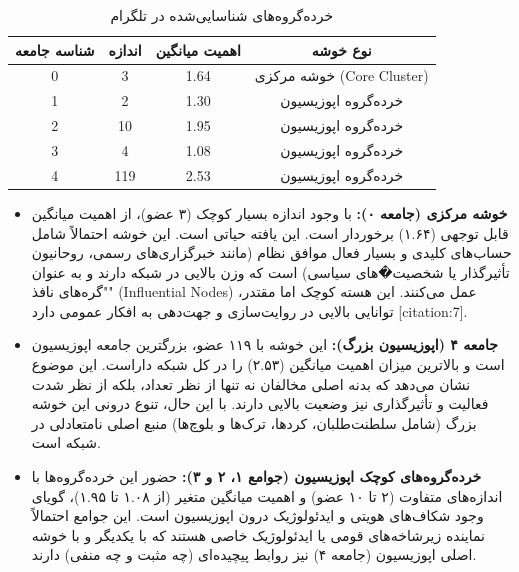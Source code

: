 \documentclass{article}
\begin{document}
	\begin{table}[h!]
		\centering
		\caption{خرده‌گروه‌های شناسایی‌شده در تلگرام}
		\label{tab:communities_telegram_2}
		\begin{tabular}{@{}cccc@{}}
			\toprule
			\textbf{شناسه جامعه} & \textbf{اندازه} & \textbf{اهمیت میانگین} & \textbf{نوع خوشه} \\ \midrule
			0                    & 3                & 1.64                   & خوشه مرکزی (Core Cluster) \\
			1                    & 2                & 1.30                   & خرده‌گروه اپوزیسیون \\
			2                    & 10               & 1.95                   & خرده‌گروه اپوزیسیون \\
			3                    & 4                & 1.08                   & خرده‌گروه اپوزیسیون \\
			4                    & 119              & 2.53                   & خرده‌گروه اپوزیسیون \\ \bottomrule
		\end{tabular}
	\end{table}
	
	\begin{itemize}
		\item \textbf{خوشه مرکزی (جامعه ۰):} با وجود اندازه بسیار کوچک (۳ عضو)، از اهمیت میانگین قابل توجهی (۱.۶۴) برخوردار است. این یافته حیاتی است. این خوشه احتمالاً شامل حساب‌های کلیدی و بسیار فعال موافق نظام (مانند خبرگزاری‌های رسمی، روحانیون تأثیرگذار یا شخصیت�های سیاسی) است که وزن بالایی در شبکه دارند و به عنوان "گره‌های نافذ" (Influential Nodes) عمل می‌کنند. این هسته کوچک اما مقتدر، توانایی بالایی در روایت‌سازی و جهت‌دهی به افکار عمومی دارد [citation:7].
		\item \textbf{جامعه ۴ (اپوزیسیون بزرگ):} این خوشه با ۱۱۹ عضو، بزرگترین جامعه اپوزیسیون است و بالاترین میزان اهمیت میانگین (۲.۵۳) را در کل شبکه داراست. این موضوع نشان می‌دهد که بدنه اصلی مخالفان نه تنها از نظر تعداد، بلکه از نظر شدت فعالیت و تأثیرگذاری نیز وضعیت بالایی دارند. با این حال، تنوع درونی این خوشه بزرگ (شامل سلطنت‌طلبان، کردها، ترک‌ها و بلوچ‌ها) منبع اصلی نامتعادلی در شبکه است.
		\item \textbf{خرده‌گروه‌های کوچک اپوزیسیون (جوامع ۱، ۲ و ۳):} حضور این خرده‌گروه‌ها با اندازه‌های متفاوت (۲ تا ۱۰ عضو) و اهمیت میانگین متغیر (از ۱.۰۸ تا ۱.۹۵)، گویای وجود شکاف‌های هویتی و ایدئولوژیک درون اپوزیسیون است. این جوامع احتمالاً نماینده زیرشاخه‌های قومی یا ایدئولوژیک خاصی هستند که با یکدیگر و با خوشه اصلی اپوزیسیون (جامعه ۴) نیز روابط پیچیده‌ای (چه مثبت و چه منفی) دارند.
	\end{itemize}
	
\end{document}
